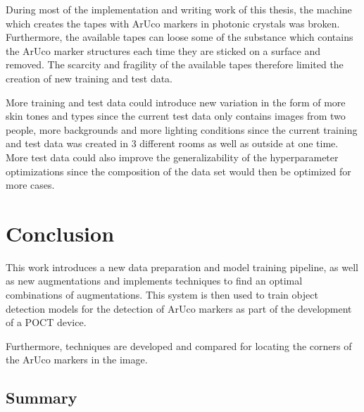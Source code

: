 \documentclass[10pt]{book}
\begin{document}
During most of the implementation and writing work of this thesis, the machine which creates the tapes with \ac{ArUco} markers in photonic crystals was broken. Furthermore, the available tapes can loose some of the substance which contains the \ac{ArUco} marker structures each time they are sticked on a surface and removed. The scarcity and fragility of the available tapes therefore limited the creation of new training and test data. 

More training and test data could introduce new variation in the form of more skin tones and types since the current test data only contains images from two people, more backgrounds and more lighting conditions since the current training and test data was created in 3 different rooms as well as outside at one time. More test data could also improve the generalizability of the hyperparameter optimizations since the composition of the data set would then be optimized for more cases.


\chapter{Conclusion}
\label{chap:conclusion}

This work introduces a new data preparation and model training pipeline, as well as new augmentations and implements techniques to find an optimal combinations of augmentations. This system is then used to train object detection models for the detection of \ac{ArUco} markers as part of the development of a \ac{POCT} device. 

Furthermore, techniques are developed and compared for locating the corners of the \ac{ArUco} markers in the image.

\section{Summary}
\end{document}
